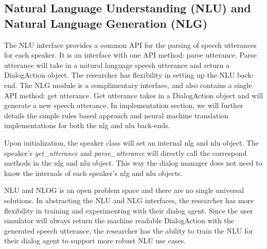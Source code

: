 \subsection{Natural Language Understanding (NLU) and Natural Language Generation (NLG)}

The NLU interface provides a common API for the parsing of speech utterances for each speaker. It is an interface with one API method: parse utterance. Parse utterance will take in a natural language speech utterance and return a DialogAction object. The researcher has flexibility in setting up the NLU back-end. The NLG module is a complimentary interface, and also contains a single API method: get utterance. Get utterance takes in a DialogAction object and will generate a new speech utterance.  In implementation section, we will further details the simple rules based approach and neural machine translation implementations for both the nlg and nlu back-ends. 

Upon initialization, the speaker class will set an internal nlg and nlu object. The speaker's\textit{ get\_utterance } and \textit{parse\_utterance} will directly call the correspond methods in the nlg and nlu object. This way the dialog manager does not need to know the internals of each speaker's nlg and nlu objects. 

NLU and NLOG is an open problem space and there are no single universal solutions. In abstracting the NLU and NLG interfaces, the researcher has more flexibility in training and experimenting with their dialog agent. Since the user simulator will always return the machine readable DialogAction with the generated speech utterance, the researcher has the ability to train the NLU for their dialog agent to support more robust NLU use cases. 






